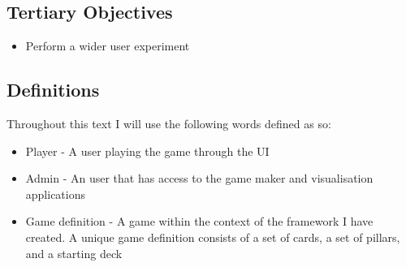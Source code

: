 \subsection{Tertiary Objectives}
\begin{itemize}
    \item Perform a wider user experiment
\end{itemize}

\subsection{Definitions}
Throughout this text I will use the following words defined as so:
\begin{itemize}
    \item Player - A user playing the game through the UI
    \item Admin - An user that has access to the game maker and visualisation applications 
    \item Game definition - A game within the context of the framework I have created. A unique game definition consists of a set of cards, a set of pillars, and a starting deck
\end{itemize}